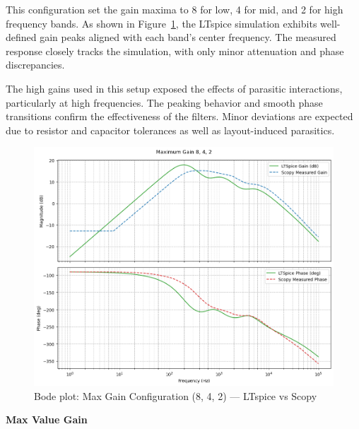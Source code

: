 \documentclass[12pt]{article}
\begin{document}
This configuration set the gain maxima to 8 for low, 4 for mid, and 2 for high frequency bands. As shown in Figure~\ref{fig:maxvalue}, the LTspice simulation exhibits well-defined gain peaks aligned with each band's center frequency. The measured response closely tracks the simulation, with only minor attenuation and phase discrepancies.

The high gains used in this setup exposed the effects of parasitic interactions, particularly at high frequencies. The peaking behavior and smooth phase transitions confirm the effectiveness of the filters. Minor deviations are expected due to resistor and capacitor tolerances as well as layout-induced parasitics.

\begin{figure}[H]
	\centering
	\includegraphics[width=\textwidth]{dp2max.png}
	\caption{Bode plot: Max Gain Configuration (8, 4, 2) — LTspice vs Scopy}
	\label{fig:maxvalue}
\end{figure}
\noindent\textbf{Max Value Gain}
\end{document}

